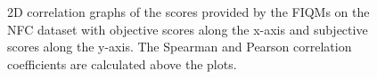 \begin{figure}[h]
\centering
    \caption{2D correlation graphs of the scores provided by the FIQMs on the NFC dataset with objective scores along the x-axis and subjective scores along the y-axis. The Spearman and Pearson correlation coefficients are calculated above the plots.}
    \label{fig:ourDS1corr}
\end{figure}

